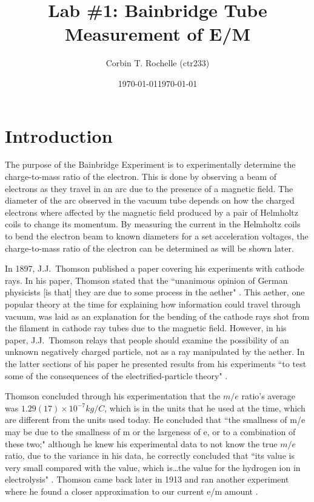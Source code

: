 \documentclass[aps,prl,10pt,twocolumn,floatfix]{revtex4-2}
\begin{document}
\begin{abstract}
\end{abstract}


\title{Lab \#1: Bainbridge Tube Measurement of E/M}
\author{Corbin T. Rochelle (ctr233)}
\date{\today}
\date{\today}

\maketitle

\section{Introduction}\label{Intro}

The purpose of the Bainbridge Experiment is to experimentally determine the charge-to-mass ratio of the electron.
This is done by observing a beam of electrons as they travel in an arc due to the presence of a magnetic field\cite{WingerBain}.
The diameter of the arc observed in the vacuum tube depends on how the charged electrons where affected by the magnetic field produced by a pair of Helmholtz coils to change its momentum.
By measuring the current in the Helmholtz coils to bend the electron beam to known diameters for a set acceleration voltages, the charge-to-mass ratio of the electron can be determined as will be shown later.

In 1897, J.J.~Thomson published a paper covering his experiments with cathode rays.
In his paper, Thomson stated that the ``unanimous opinion of German physicists [is that] they are due to some process in the aether" \cite{CathodeRays}.
This aether, one popular theory at the time for explaining how information could travel through vacuum, was laid as an explanation for the bending of the cathode rays shot from the filament in cathode ray tubes due to the magnetic field.
However, in his paper, J.J.~Thomson relays that people should examine the possibility of an unknown negatively charged particle, not as a ray manipulated by the aether.
In the latter sections of his paper he presented results from his experiments ``to test some of the consequences of the electrified-particle theory" \cite{CathodeRays}.

Thomson concluded through his experimentation that the $m/e$ ratio's average was  $1.29(17)\!\times\!10^{-7} kg/C$, which is in the units that he used at the time, which are different from the units used today.
He concluded that ``the smallness of m/e may be due to the smallness of m or the largeness of e, or to a combination
of these two;"
although he knew his experimental data to not know the true $m/e$ ratio, due to the variance in his data, he correctly concluded that ``its value is very small compared with the value, which is\ldots the value for the hydrogen ion in electrolysis" \cite{CathodeRays}.
Thomson came back later in 1913 and ran another experiment where he found a closer approximation to our current e/m amount \cite{Wiki}.
\end{document}
